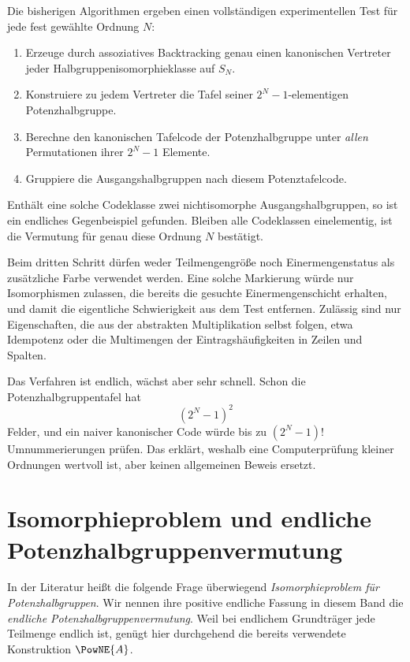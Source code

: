 \documentclass[main.tex]{subfiles}
\begin{document}
Die bisherigen Algorithmen ergeben einen vollständigen experimentellen Test
für jede fest gewählte Ordnung \(N\):
\begin{enumerate}
  \item Erzeuge durch assoziatives Backtracking genau einen kanonischen
    Vertreter jeder Halbgruppenisomorphieklasse auf \(S_N\).
  \item Konstruiere zu jedem Vertreter die Tafel seiner
    \(2^N-1\)-elementigen Potenzhalbgruppe.
  \item Berechne den kanonischen Tafelcode der Potenzhalbgruppe unter
    \emph{allen} Permutationen ihrer \(2^N-1\) Elemente.
  \item Gruppiere die Ausgangshalbgruppen nach diesem Potenztafelcode.
\end{enumerate}
Enthält eine solche Codeklasse zwei nichtisomorphe Ausgangshalbgruppen, so ist
ein endliches Gegenbeispiel gefunden.  Bleiben alle Codeklassen einelementig,
ist die Vermutung für genau diese Ordnung \(N\) bestätigt.

\begin{remark}
Beim dritten Schritt dürfen weder Teilmengengröße noch Einermengenstatus als
zusätzliche Farbe verwendet werden.  Eine solche Markierung würde nur
Isomorphismen zulassen, die bereits die gesuchte Einermengenschicht erhalten,
und damit die eigentliche Schwierigkeit aus dem Test entfernen.  Zulässig
sind nur Eigenschaften, die aus der abstrakten Multiplikation selbst folgen,
etwa Idempotenz oder die Multimengen der Eintragshäufigkeiten in Zeilen und
Spalten.
\end{remark}

Das Verfahren ist endlich, wächst aber sehr schnell.  Schon die
Potenzhalbgruppentafel hat
\[
  (2^N-1)^2
\]
Felder, und ein naiver kanonischer Code würde bis zu
\((2^N-1)!\) Umnummerierungen prüfen.  Das erklärt, weshalb eine
Computerprüfung kleiner Ordnungen wertvoll ist, aber keinen allgemeinen
Beweis ersetzt.

\section{Isomorphieproblem und endliche Potenzhalbgruppenvermutung}

In der Literatur heißt die folgende Frage überwiegend
\emph{Isomorphieproblem für Potenzhalbgruppen}.  Wir nennen ihre positive
endliche Fassung in diesem Band die \emph{endliche
Potenzhalbgruppenvermutung}.  Weil bei endlichem Grundträger jede Teilmenge
endlich ist, genügt hier durchgehend die bereits verwendete Konstruktion
\(\PowNE{A}\).
\end{document}
